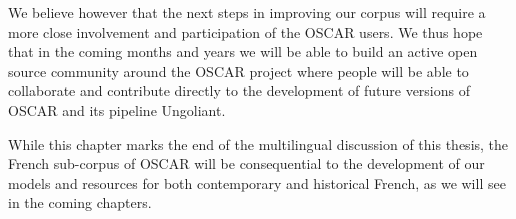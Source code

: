 We believe however that the next steps in improving our corpus will require a more close involvement and participation of the OSCAR users. We thus hope that in the coming months and years we will be able to build an active open source community around the OSCAR project where people will be able to collaborate and contribute directly to the development of future versions of OSCAR and its pipeline Ungoliant.

While this chapter marks the end of the multilingual discussion of this thesis, the French sub-corpus of OSCAR will be consequential to the development of our models and resources for both contemporary and historical French, as we will see in the coming chapters.
